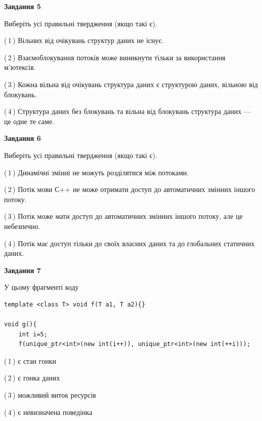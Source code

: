 \documentclass[12pt, ukrainian]{article}
\begin{document}
\begin {large}
{\begin{center}
\textbf{Завдання 5}
\end{center}

Виберіть усі правильні твердження (якщо такі є).\par
\vspace{2mm}

(\,1\,) Вільних від очікувань структур даних не існує.%

(\,2\,) Взаємоблокування потоків може виникнути тільки за використання м’ютексів.%

(\,3\,) Кожна вільна від очікувань структура даних є структурою даних, вільною від блокувань.%

(\,4\,) Структура даних без блокувань та вільна від блокувань структура даних --- це одне те саме.%
\newpage


\begin{center}
\textbf{Завдання 6}
\end{center}

Виберіть усі правильні твердження (якщо такі є).\par
\vspace{2mm}

(\,1\,) Динамічні змінні не можуть розділятися між потоками.%

(\,2\,) Потік мови С++ не може отримати доступ до автоматичних змінних іншого потоку.%

(\,3\,) Потік може мати доступ до автоматичних змінних іншого потоку, але це небезпечно.%

(\,4\,) Потік має доступ тільки до своїх власних даних та до глобальних статичних даних.%


\begin{center}
\textbf{Завдання 7}
\end{center}

У цьому фрагменті коду
\begin{verbatim}
template <class T> void f(T a1, T a2){}

void g(){
    int i=5;
    f(unique_ptr<int>(new int(i++)), unique_ptr<int>(new int(++i)));
\end{verbatim}

(\,1\,) є стан гонки%

(\,2\,) є гонка даних%

(\,3\,) можливий виток ресурсів%

(\,4\,) є невизначена поведінка%

}
\end {large}

\vspace{4mm}
\newpage
\end{document}
